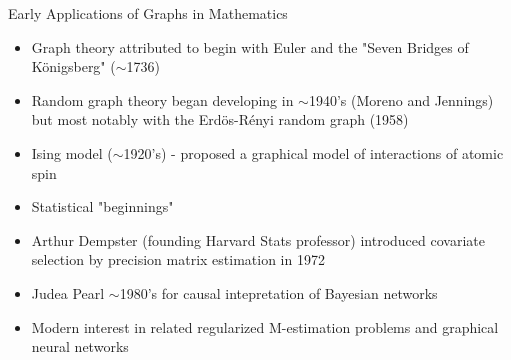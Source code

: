 \documentclass{beamer}
\begin{document}
\begin{frame}{Early Applications of Graphs in Mathematics}
    \begin{itemize}
        \item Graph theory attributed to begin with Euler and the "Seven Bridges of K\"onigsberg" ($\sim$1736)
        \item Random graph theory began developing in $\sim$1940's (Moreno and Jennings) but most notably with the Erd\"os-R\'enyi random graph (1958)
        \item Ising model ($\sim$1920's) - proposed a graphical model of interactions of atomic spin
        \item Statistical "beginnings"%
        \item Arthur Dempster (founding Harvard Stats professor) introduced covariate selection by precision matrix estimation in 1972 \cite{dempster_covariance_1972}
        \item Judea Pearl $\sim$1980's for causal intepretation of Bayesian networks
        \item Modern interest in related regularized M-estimation problems and graphical neural networks 
    \end{itemize}
    \end{frame}
\end{document}
